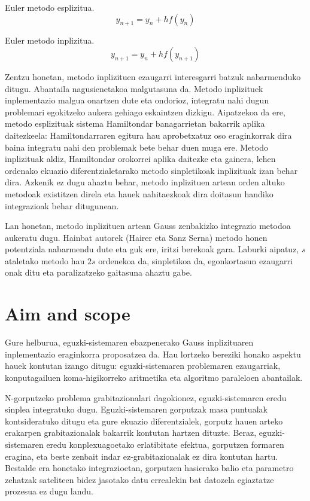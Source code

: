 Euler metodo esplizitua.					  
\begin{equation}
y_{n+1}=y_n+hf(y_n)
\end{equation}

Euler metodo inplizitua.
\begin{equation}
y_{n+1}=y_n+hf(y_{n+1})
\end{equation}

Zentzu honetan, metodo inplizituen ezaugarri interesgarri batzuk nabarmenduko ditugu. Abantaila nagusienetakoa malgutasuna da.  Metodo inplizituek inplementazio malgua onartzen dute eta ondorioz, integratu nahi dugun problemari egokitzeko aukera gehiago eskaintzen dizkigu. Aipatzekoa da ere, metodo esplizituak sistema Hamiltondar banagarrietan bakarrik aplika daitezkeela: Hamiltondarraren egitura hau aprobetxatuz oso eraginkorrak dira baina integratu nahi den problemak bete behar duen muga ere. Metodo inplizituak aldiz, Hamiltondar orokorrei aplika daitezke eta gainera, lehen ordenako ekuazio diferentzialetarako  metodo sinpletikoak inplizituak izan behar dira.  Azkenik ez dugu ahaztu behar, metodo inplizituen artean orden altuko metodoak existitzen direla  eta hauek nahitaezkoak dira doitasun handiko integrazioak behar ditugunean.     

Lan honetan, metodo inplizituen artean Gauss zenbakizko integrazio metodoa aukeratu dugu. Hainbat autorek (Hairer \cite{Hairer2006}\cite{Hairer2008} eta Sanz Serna\cite{JMSanz-Serna1994}) metodo honen potentziala nabarmendu dute eta guk ere, iritzi berekoak gara. Laburki aipatuz, $s$ ataletako metodo hau $2s$ ordenekoa da, sinpletikoa da, egonkortasun ezaugarri onak ditu eta paralizatzeko gaitasuna ahaztu gabe.      

\section{Aim and scope}

Gure helburua, eguzki-sistemaren ebazpenerako Gauss inplizituaren inplementazio eraginkorra proposatzea da. Hau lortzeko  bereziki honako aspektu hauek kontutan izango ditugu: eguzki-sistemaren problemaren ezaugarriak, konputagailuen koma-higikorreko aritmetika eta algoritmo paraleloen abantailak.  

N-gorputzeko problema grabitazionalari dagokionez, eguzki-sistemaren eredu sinplea integratuko dugu. Eguzki-sistemaren gorputzak masa puntualak kontsideratuko ditugu eta gure ekuazio diferentzialek, gorputz hauen arteko erakarpen grabitazionalak bakarrik kontutan hartzen dituzte. Beraz, eguzki-sistemaren eredu konplexuagoetako erlatibitate efektua, gorputzen formaren eragina, eta beste zenbait indar ez-grabitazionalak ez dira kontutan hartu.
Bestalde era honetako integrazioetan, gorputzen hasierako balio eta parametro zehatzak sateliteen bidez jasotako datu errealekin bat datozela egiaztatze prozesua ez dugu landu.

